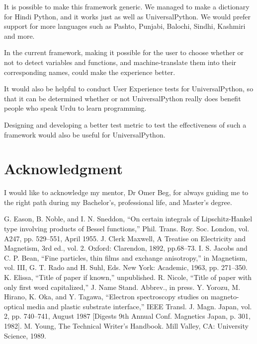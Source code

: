 \documentclass[conference]{IEEEtran}
\begin{document}
It is possible to make this framework generic. We managed to make a dictionary for Hindi Python, and it works just as well as UniversalPython. We would prefer support for more languages such as Pashto, Punjabi, Balochi, Sindhi, Kashmiri and more.

In the current framework, making it possible for the user to choose whether or not to detect variables and functions, and machine-translate them into their corresponding names, could make the experience better.

It would also be helpful to conduct User Experience tests for UniversalPython, so that it can be determined whether or not UniversalPython really does benefit people who speak Urdu to learn programming.

Designing and developing a better test metric to test the effectiveness of such a framework would also be useful for UniversalPython.

\section*{Acknowledgment}

I would like to acknowledge my mentor, Dr Omer Beg, for always guiding me to the right path during my Bachelor's, professional life, and Master's degree.

\begin{thebibliography}{00}
    
 G. Eason, B. Noble, and I. N. Sneddon, ``On certain integrals of Lipschitz-Hankel type involving products of Bessel functions,'' Phil. Trans. Roy. Soc. London, vol. A247, pp. 529--551, April 1955.
 J. Clerk Maxwell, A Treatise on Electricity and Magnetism, 3rd ed., vol. 2. Oxford: Clarendon, 1892, pp.68--73.
 I. S. Jacobs and C. P. Bean, ``Fine particles, thin films and exchange anisotropy,'' in Magnetism, vol. III, G. T. Rado and H. Suhl, Eds. New York: Academic, 1963, pp. 271--350.
 K. Elissa, ``Title of paper if known,'' unpublished.
 R. Nicole, ``Title of paper with only first word capitalized,'' J. Name Stand. Abbrev., in press.
 Y. Yorozu, M. Hirano, K. Oka, and Y. Tagawa, ``Electron spectroscopy studies on magneto-optical media and plastic substrate interface,'' IEEE Transl. J. Magn. Japan, vol. 2, pp. 740--741, August 1987 [Digests 9th Annual Conf. Magnetics Japan, p. 301, 1982].
 M. Young, The Technical Writer's Handbook. Mill Valley, CA: University Science, 1989.
\end{thebibliography}
\vspace{12pt}
\end{document}
